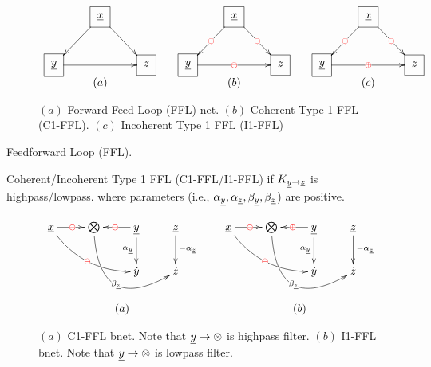 \begin{figure}
$$
\begin{array}{ccccc}
\xymatrix{
&\Rect{\rvx}\ar[dl]
\ar[dr]
\\
\Rect{\rvy}\ar[rr]
&&\Rect{\rvz}
}&
&
\xymatrix{
&\Rect{\rvx}\ar[dl]|\redoplus
\ar[dr]|\redoplus
\\
\Rect{\rvy}\ar[rr]|\redoplus
&&\Rect{\rvz}
}
&
&
\xymatrix{
&\Rect{\rvx}\ar[dl]|\redoplus
\ar[dr]|\redoplus
\\
\Rect{\rvy}\ar[rr]|\redominus
&&\Rect{\rvz}
}
\\
(a)
&&(b)
&&(c)
\end{array}
$$
\caption{$(a)$ Forward Feed Loop (FFL) net.
$(b)$ Coherent Type 1 FFL (C1-FFL).
$(c)$ Incoherent Type 1 FFL (I1-FFL)}

\end{figure}










Feedforward Loop (FFL).

Coherent/Incoherent Type 1 FFL (C1-FFL/I1-FFL) if $K_{\rvy\rarrow\rvz}$ is highpass/lowpass.
where parameters (i.e., $\alp_\rvy, \alp_\rvz, \beta_\rvy, \beta_{\rvz}$) are positive.

\begin{figure}[h!]
$$
\begin{array}{ccc}
\xymatrix{
\rvx \ar@/_1pc/[drr]|\redoplus
\ar[r]|\redoplus
&\bigotimes\ar@/_3pc/[drr]|{\beta_\rvz}
& \rvy\ar[d]_{-\alp_\rvy}\ar[l]|
\redoplus
&\rvz\ar[d]^{-\alp_\rvz}
\\
&
& \dot{y}
&
\dot{z} 
}
&&
\xymatrix{
\rvx \ar@/_1pc/[drr]|\redoplus\ar[r]|\redoplus
&\bigotimes\ar@/_3pc/[drr]|{\beta_\rvz}
& \rvy\ar[d]_{-\alp_\rvy}\ar[l]|
\redominus
&\rvz\ar[d]^{-\alp_\rvz}
\\
&
& \dot{y}
&
\dot{z} 
}
\\
\\
(a)&&(b)
\end{array}
$$
\caption{$(a)$ C1-FFL bnet.
Note that $\rvy\rarrow \otimes$
is highpass filter.
$(b)$ I1-FFL bnet. Note that $\rvy\rarrow \otimes$
is lowpass filter.
}
\label{fig-bnet-c1-ffl}
\end{figure}


